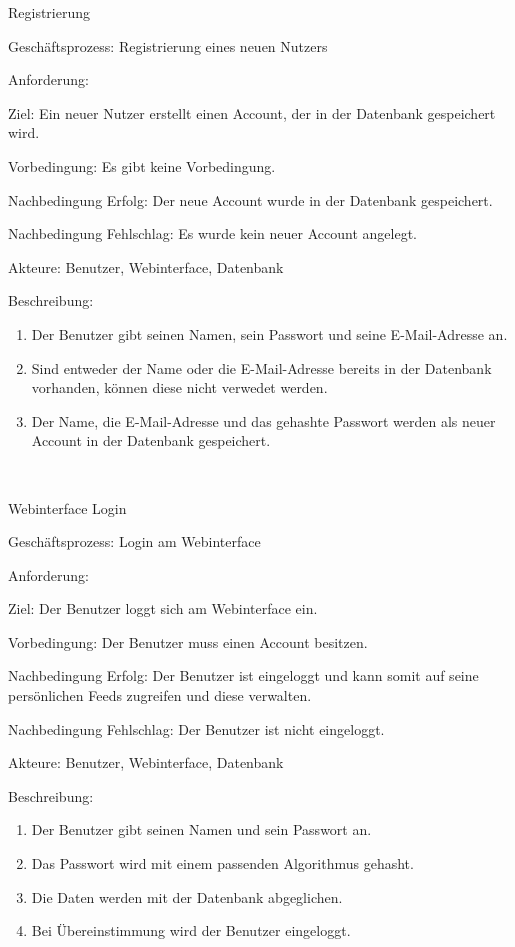 \begin{function}{50}{Registrierung}
\item[Geschäftsprozess:] Registrierung eines neuen Nutzers
\item[Anforderung:] 
\item[Ziel:] Ein neuer Nutzer erstellt einen Account, der in der Datenbank gespeichert wird.
\item[Vorbedingung:] Es gibt keine Vorbedingung.
\item[Nachbedingung Erfolg:] Der neue Account wurde in der Datenbank gespeichert.
\item[Nachbedingung Fehlschlag:] Es wurde kein neuer Account angelegt.
\item[Akteure:] Benutzer, Webinterface, Datenbank
\item[Beschreibung:] ~
\begin{enumerate}
\item Der Benutzer gibt seinen Namen, sein Passwort und seine E-Mail-Adresse an.
\item Sind entweder der Name oder die E-Mail-Adresse bereits in der Datenbank vorhanden, können diese nicht verwedet werden.
\item Der Name, die E-Mail-Adresse und das gehashte Passwort werden als neuer Account in der Datenbank gespeichert.
\end{enumerate}
\end{function} ~

\begin{function}{60}{Webinterface Login}
\item[Geschäftsprozess:] Login am Webinterface
\item[Anforderung:] 
\item[Ziel:] Der Benutzer loggt sich am Webinterface ein.
\item[Vorbedingung:] Der Benutzer muss einen Account besitzen.
\item[Nachbedingung Erfolg:] Der Benutzer ist eingeloggt und kann somit auf seine persönlichen Feeds zugreifen und diese verwalten.
\item[Nachbedingung Fehlschlag:] Der Benutzer ist nicht eingeloggt.
\item[Akteure:] Benutzer, Webinterface, Datenbank
\item[Beschreibung:] ~
\begin{enumerate}
\item Der Benutzer gibt seinen Namen und sein Passwort an.
\item Das Passwort wird mit einem passenden Algorithmus gehasht.
\item Die Daten werden mit der Datenbank abgeglichen.
\item Bei Übereinstimmung wird der Benutzer eingeloggt.
\end{enumerate}
\end{function} ~

